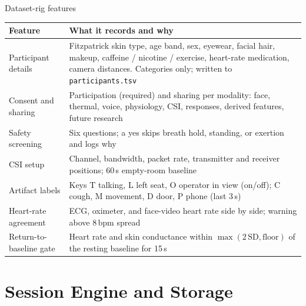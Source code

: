 \documentclass[aspectratio=169,11pt]{beamer}
\newcommand{\code}[1]{{\small\texttt{#1}}}
\begin{document}
\begin{frame}{Dataset-rig features}
  \footnotesize
  \begin{tabularx}{\textwidth}{@{}l X@{}}
    \toprule
    \textbf{Feature} & \textbf{What it records and why} \\
    \midrule
    Participant details & Fitzpatrick skin type, age band, sex, eyewear, facial hair, makeup, caffeine / nicotine / exercise, heart-rate medication, camera distances. Categories only; written to \code{participants.tsv} \\
    Consent and sharing & Participation (required) and sharing per modality: face, thermal, voice, physiology, CSI, responses, derived features, future research \\
    Safety screening & Six questions; a yes skips breath hold, standing, or exertion and logs why \\
    CSI setup & Channel, bandwidth, packet rate, transmitter and receiver positions; 60\,s empty-room baseline \\
    Artifact labels & Keys T talking, L left seat, O operator in view (on/off); C cough, M movement, D door, P phone (last 3\,s) \\
    Heart-rate agreement & ECG, oximeter, and face-video heart rate side by side; warning above 8\,bpm spread \\
    Return-to-baseline gate & Heart rate and skin conductance within $\max(2\,\mathrm{SD},\text{floor})$ of the resting baseline for 15\,s \\
    \bottomrule
  \end{tabularx}
\end{frame}

\section{Session Engine and Storage}
\end{document}
